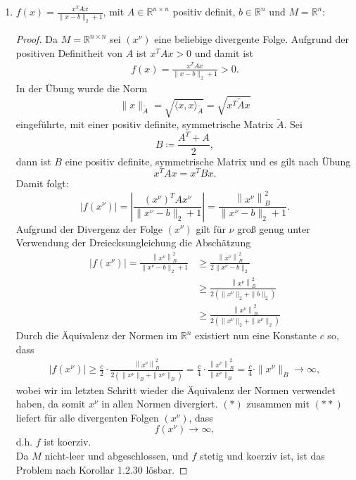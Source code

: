 \documentclass[12pt]{extreport} %
\newcommand{\R}{\mathbb{R}}
\theoremstyle{named}
\theoremstyle{nnamed}
\theoremstyle{itshape}
\theoremstyle{normal}
\begin{document}
\begin{enumerate}
\begin{proof}
			Es gilt $f(x) = (3 x_1 - x_2^2)^2 \geq 0 = \inf_{x \in M} f(x)$, wobei 
			$$ f(x) = 0 \iff (3 x_1 - x_2^2)^2 = 0 \iff x_1 = \frac{x_2^2}{3} $$
			Da es $(x_1, x_2) \in M$ gibt, die die obige Bedingung erfüllen, z.B. $x = (1/3, 1)$, nimmt $f$ auf $M$ sein Infimum an, und das Problem ist nach Definition 1.2.3. lösbar.
			\end{proof}
		\item $f(x) = \frac{x^T A x}{\| x - b\|_2 + 1}$, mit $A \in \R^{n \times n}$ positiv definit, $b \in \R^n$ und $M = \R^n$:
					\begin{proof}
			Da $M = \R^{n \times n}$ sei $(x^\nu)$ eine beliebige divergente Folge. Aufgrund der positiven Definitheit von $A$ ist $ x^T A x > 0$ und damit ist
			\begin{align}
				f(x) = \frac{x^T A x}{\| x - b\|_2 + 1} > 0. \tag*{$(*)$}
			\end{align}
			In der Übung wurde die Norm
			$$ \| x \|_{\tilde{A}} = \sqrt{\langle x, x \rangle_{\tilde{A}}} = \sqrt{x^T \tilde{A} x} $$
			eingeführte, mit einer positiv definite, symmetrische Matrix $\tilde{A}$. Sei
			$$B \coloneqq \frac{A^T + A}{2},$$
			dann ist $B$ eine positiv definite, symmetrische Matrix und es gilt nach Übung
			$$ x^T A x = x^T B x. $$
			Damit folgt:
			$$ \left| f(x^\nu) \right| =  \left| \frac{\left(x^\nu \right)^T A x^\nu }{\| x^\nu - b\|_2 + 1} \right| = \frac{\left\| x^\nu \right\|_{B}^2}{\| x^\nu - b\|_2 + 1}. $$
			Aufgrund der Divergenz der Folge $(x^\nu)$ gilt für $\nu$ groß genug unter Verwendung der Dreiecksungleichung die Abschätzung
			\begin{align*}
				 \left| f(x^\nu) \right| =  \frac{\left\| x^\nu \right\|_{B}^2}{\| x^\nu - b\|_2 + 1} & \geq \frac{\left\| x^\nu \right\|_{B}^2}{2 \| x^\nu - b\|_2 } \\
				 	& \geq \frac{\left\| x^\nu \right\|_{B}^2}{2 \left( \| x^\nu \|_2 + \| b\|_2 \right)}   \\
				 	& \geq \frac{\left\| x^\nu \right\|_{B}^2}{2 \left( \| x^\nu \|_2 + \| x^\nu \|_2 \right)}  
			\end{align*}
			Durch die Äquivalenz der Normen im $\R^n$ existiert nun eine Konstante $c$ so, dass
			\begin{align}
				\left| f(x^\nu) \right|  \geq \frac{c}{2} \cdot \frac{\left\| x^\nu \right\|_{B}^2}{2 \left( \| x^\nu \|_B + \| x^\nu \|_B \right)} = \frac{c}{4} \cdot \frac{\left\| x^\nu \right\|_{B}^2}{ \| x^\nu \|_B} = \frac{c}{4} \cdot \| x^\nu \|_B \longrightarrow \infty, \tag*{$(**)$}
			\end{align}		
			wobei wir im letzten Schritt wieder die Äquivalenz der Normen verwendet haben, da somit $x^\nu$ in allen Normen divergiert. $(*)$ zusammen mit $(**)$ liefert für alle divergenten Folgen $(x^\nu)$, dass 
			$$  f(x^\nu) \longrightarrow \infty, $$
			d.h. $f$ ist koerziv. ~\\
			
			Da $M$ nicht-leer und abgeschlossen, und $f$ stetig und koerziv ist, ist das Problem nach Korollar 1.2.30 lösbar.
		\end{proof}
	\end{enumerate}
\end{document}
